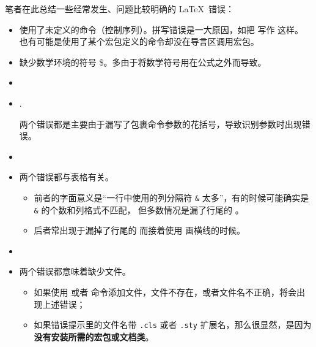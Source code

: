 笔者在此总结一些经常发生、问题比较明确的 \LaTeX\ 错误：

\begin{itemize}
\item {}

使用了未定义的命令（控制序列）。拼写错误是一大原因，如把  写作  这样。
也有可能是使用了某个宏包定义的命令却没在导言区调用宏包。

\item {}

缺少数学环境的符号 \$。多由于将数学符号用在公式之外而导致。

\item {}

\item {}.

两个错误都是主要由于漏写了包裹命令参数的花括号，导致识别参数时出现错误。

\item {}

\item {}

两个错误都与表格有关。
\begin{itemize}
  \item 前者的字面意义是“一行中使用的列分隔符 \texttt\& 太多”，有的时候可能确实是 \texttt\& 的个数和列格式不匹配，
  但多数情况是漏了行尾的 。
  \item 后者常出现于漏掉了行尾的  而接着使用  画横线的时候。
\end{itemize}

\item {}

\item {}

两个错误都意味着缺少文件。
\begin{itemize}
  \item 如果使用  或者  命令添加文件，文件不存在，或者文件名不正确，将会出现上述错误；
  \item 如果错误提示里的文件名带 \texttt{.cls} 或者 \texttt{.sty} 扩展名，那么很显然，是因为\textbf{没有安装所需的宏包或文档类}。
\end{itemize}


\end{itemize}

